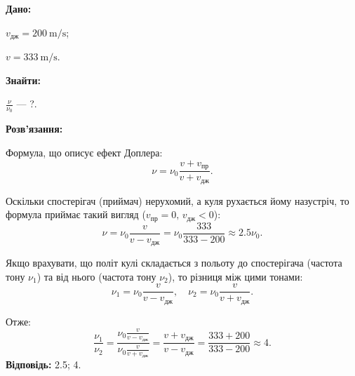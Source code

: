 \documentclass[a4paper,oneside,DIV=9,12pt]{scrartcl}
\newcommand\given{\noindent\textbf{Дано:}}
\newcommand\find{\noindent\textbf{Знайти:}}
\newcommand\solution{\noindent\textbf{Розв'язання:}}
\newcommand\answer[1]{\noindent\textbf{Відповідь:} #1}
\begin{document}
	
	\given\par
		$v_{\text{дж}} = \SI{200}{\metre\per\second}$;
		
		$v = \SI{333}{\metre\per\second}$.
		
	\find\par
		$\frac{\nu}{\nu_{0}}$ --- ?.
		
	\solution\par
		Формула, що описує ефект Доплера:
		\[
			\nu = \nu_0 \frac{v + v_{\text{пр}}}{v + v_{\text{дж}}}.
		\]
		
		Оскільки спостерігач (приймач) нерухомий, а куля рухається йому назустріч, то формула приймає такий вигляд ($v_{\text{пр}} = 0, \, v_{\text{дж}} < 0$):
		\[
			\nu = \nu_0 \frac{v}{v - v_{\text{дж}}} = \nu_0 \frac{333}{333 - 200} \approx \num{2,5}\nu_0.
		\]
		
		Якщо врахувати, що політ кулі складається з польоту до спостерігача (частота тону $\nu_1$) та від нього (частота тону $\nu_2$), то різниця між цими тонами:
		\[
			\nu_1 = \nu_0 \frac{v}{v - v_{\text{дж}}}, \quad \nu_2 = \nu_0 \frac{v}{v + v_{\text{дж}}}.
		\]
		
		Отже:
		\[
			\frac{\nu_1}{\nu_2} = \frac{\nu_0 \frac{v}{v - v_{\text{дж}}}}{\nu_0 \frac{v}{v + v_{\text{дж}}}} = \frac{v + v_{\text{дж}}}{v - v_{\text{дж}}} =\frac{333 + 200}{333 - 200} \approx 4.
		\]
	\answer{\num{2,5}; \num{4}}.
	
\end{document}
